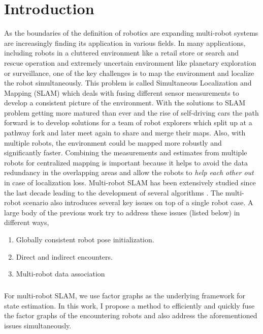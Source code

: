 \chapter{Introduction}

As the boundaries of the definition of robotics are expanding multi-robot systems are increasingly finding its application in various fields. In many applications, including robots in a cluttered environment like a retail store or search and rescue operation and extremely uncertain environment like planetary exploration or surveillance, one of the key challenges is to map the environment and localize the robot simultaneously. This problem is called Simultaneous Localization and Mapping (SLAM) which deals with fusing different sensor measurements to develop a consistent picture of the environment. With the solutions to SLAM problem getting more matured than ever and the rise of self-driving cars the path forward is to develop solutions for a team of robot explorers which split up at a pathway fork and later meet again to share and merge their maps. Also, with multiple robots, the environment could be mapped more robustly and significantly faster. Combining the measurements and estimates from multiple robots for centralized mapping is important because it helps to avoid the data redundancy in the overlapping areas and allow the robots to \textit{help each other out} in case of localization loss. Multi-robot SLAM has been extensively studied since the last decade leading to the development of several algorithms \cite{howardmulti,thrunmulti,zhoumulti}. The multi-robot scenario also introduces several key issues on top of a single robot case. A large body of the previous work try to address these issues (listed below) in different ways,  

\begin{enumerate}
\item Globally consistent robot pose initialization.
\item Direct and indirect encounters.
\item Multi-robot data association
\end{enumerate} 

\paragraph{}
For multi-robot SLAM, we use factor graphs \cite{factorgraph} as the underlying framework for state estimation. In this work, I propose a method to efficiently and quickly fuse the factor graphs of the encountering robots and also address the aforementioned issues simultaneously.
 
